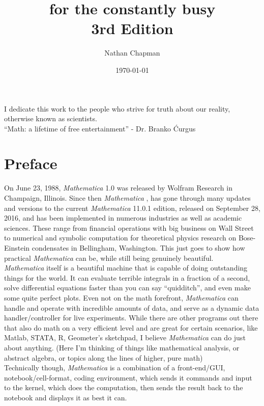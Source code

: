 \documentclass[11pt,letterpaper,twoside,titlepage]{report}
\author{Nathan Chapman}
\title{ \Mathematica for the constantly busy \\ 3rd Edition}
\date{\today}
\newenvironment{dedication}
  {%
   \thispagestyle{empty}%
   \vspace*{\stretch{1}}%
   \itshape             %
   \raggedleft          %
  }
  {\par %
   \vspace{\stretch{3}} %
   \clearpage           %
  }
\newcommand{\Mathematica}{\textit{Mathematica} }
\begin{document}
	\maketitle
	
	\begin{dedication}
	
		I dedicate this work to the people who strive for truth about our reality, otherwise known as scientists. \\
		
		``Math: a lifetime of free entertainment'' - Dr. Branko \'{C}urgus
	
	\end{dedication}
	
	\chapter*{Preface}
	
		On June 23, 1988, \Mathematica 1.0 was released by Wolfram Research in Champaign, Illinois.  Since then \Mathematica, has gone through many updates and versions to the current \Mathematica 11.0.1 edition, released on September 28, 2016, and has been implemented in numerous industries as well as academic sciences.  These range from financial operations with big business on Wall Street to numerical and symbolic computation for theoretical physics research on Bose-Einstein condensates in Bellingham, Washington.  This just goes to show how practical \Mathematica can be, while still being genuinely beautiful. \\
	
		\Mathematica itself is a beautiful machine that is capable of doing outstanding things for the world.  It can evaluate terrible integrals in a fraction of a second, solve differential equations faster than you can say ``quidditch'', and even make some quite perfect plots.  Even not on the math forefront, \Mathematica can handle and operate with incredible amounts of data, and serve as a dynamic data handler/controller for live experiments.  While there are other programs out there that also do math on a very efficient level and are great for certain scenarios, like Matlab, STATA, R, Geometer's sketchpad, I believe \Mathematica can do just about anything. (Here I'm thinking of things like mathematical analysis, or abstract algebra, or topics along the lines of higher, pure math) \\
		
		Technically though, \Mathematica is a combination of a front-end/GUI, notebook/cell-format, coding environment, which sends it commands and input to the kernel, which does the computation, then sends the result back to the notebook and displays it as best it can. \\
		
\end{document}
